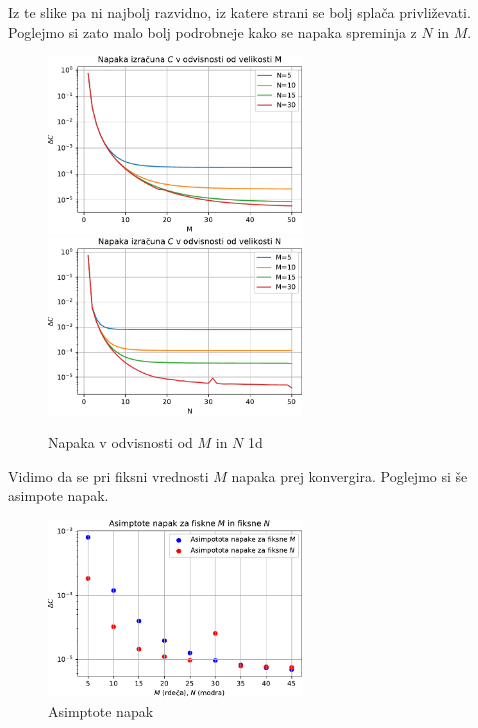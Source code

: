 Iz te slike pa ni najbolj razvidno, iz katere strani se bolj splača privliževati.
\newpage
Poglejmo si zato malo bolj podrobneje kako se napaka spreminja z $N$ in $M$.
\begin{figure}[h]
    \centering
    \includegraphics[width=0.6\textwidth]{pdf/C(M).pdf}
    \includegraphics[width=0.6\textwidth]{pdf/C(N).pdf}
    \caption{Napaka v odvisnosti od $M$ in $N$ 1d}
\end{figure}
\newpage
Vidimo da se pri fiksni vrednosti $M$ napaka prej konvergira. Poglejmo si še asimpote napak.
\begin{figure}[h]
    \centering
    \includegraphics[width=0.6\textwidth]{pdf/Asimpotote_napak.pdf}
    \caption{Asimptote napak}
\end{figure}
